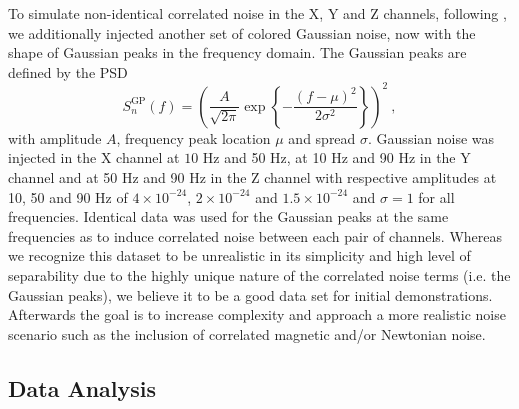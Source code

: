 \documentclass[%
 reprint,
 amsmath,amssymb,
 aps,
 nofootinbib,
]{revtex4-2}
\begin{document}
To simulate  non-identical correlated noise in the X, Y and Z channels, following \cite{Janssens2023}, we additionally injected another set of colored Gaussian noise, now with the shape of Gaussian peaks in the frequency domain. The Gaussian peaks are defined by the PSD
\begin{equation}
    S_n^{\mathrm{GP}}(f)= \left( \frac{A}{\sqrt{2\pi}}\exp\left\{ 
- \frac{(f-\mu)^2}{2\sigma^2}\right\}\right)^2\ ,
\end{equation}
with amplitude $A$, frequency peak location $\mu$ and spread $\sigma$.
Gaussian noise was injected in the X channel at $10$ Hz and 50 Hz, at 10
Hz and 90 Hz in the Y channel and at 50 Hz and 90 Hz in the Z channel with respective amplitudes at 10, 50 and 90 Hz of $4\times 10^{-24}$, $2\times 10^{-24}$ and $1.5\times 10^{-24}$ and $\sigma=1$ for all frequencies. Identical data was used for the Gaussian peaks at the same frequencies as to induce correlated noise between each pair of channels.
Whereas we recognize this dataset to be unrealistic in its simplicity and high level of separability due to the highly unique nature of the correlated noise terms (i.e. the Gaussian peaks), we believe it to be a good data set for initial demonstrations. Afterwards the goal is to increase complexity and approach a more realistic noise scenario such as the inclusion of correlated magnetic and/or Newtonian noise.



\subsection{Data Analysis}


\end{document}
